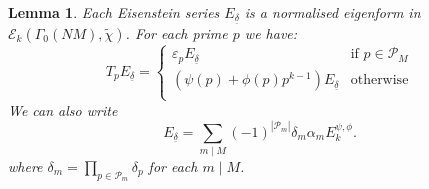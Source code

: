 \documentclass{amsart}
\theoremstyle{plain}
\newtheorem{lemma}[theorem]{Lemma}
\theoremstyle{definition}
\begin{document}
\begin{lemma}
\label{lemma:E}
Each Eisenstein series $E_{\underline{\delta}}$ is a normalised eigenform in \\ $\mathcal{E}_k(\Gamma_0(NM), \tilde{\chi})$. For each prime $p$ we have:
\begin{equation*}
T_p E_{\underline{\delta}}=
\begin{cases}
 \varepsilon_pE_{\underline{\delta}} & \text{if } p \in \mathcal{P}_M \\
 (\psi(p)+\phi(p)p^{k-1})E_{\underline{\delta}} & \text{otherwise} \\
\end{cases}
\end{equation*}
We can also write 
\begin{equation}
\label{eq:altE}
    E_{\underline{\delta}}=\sum_{m \mid M}(-1)^{|\mathcal{P}_m|} \delta_m \alpha_m E_k^{\psi,\phi}.
\end{equation}
where $\delta_m = \prod_{p \in \mathcal{P}_m} \delta_p$ for each $m\mid M$.
\end{lemma}
\end{document}
